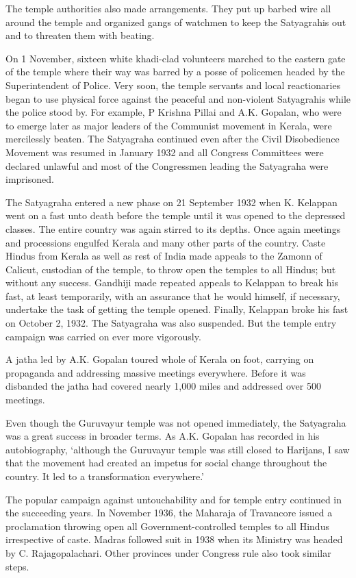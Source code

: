 The temple authorities also made arrangements. They put up barbed wire all around the temple and organized gangs of watchmen to keep the Satyagrahis out and to threaten them with beating.

On 1 November, sixteen white khadi-clad volunteers marched to the eastern gate of the temple where their way was barred by a posse of policemen headed by the Superintendent of Police. Very soon, the temple servants and local reactionaries began to use physical force against the peaceful and non-violent Satyagrahis while the police stood by. For example, P Krishna Pillai and A.K. Gopalan, who were to emerge later as major leaders of the Communist movement in Kerala, were mercilessly beaten. The Satyagraha continued even after the Civil Disobedience Movement was resumed in January 1932 and all Congress Committees were declared unlawful and most of the Congressmen leading the Satyagraha were imprisoned.

The Satyagraha entered a new phase on 21 September 1932 when K. Kelappan went on a fast unto death before the temple until it was opened to the depressed classes. The entire country was again stirred to its depths. Once again meetings and processions engulfed Kerala and many other parts of the country. Caste Hindus from Kerala as well as rest of India made appeals to the Zamonn of Calicut, custodian of the temple, to throw open the temples to all Hindus; but without any success. Gandhiji made repeated appeals to Kelappan to break his fast, at least temporarily, with an assurance that he would himself, if necessary, undertake the task of getting the temple opened. Finally, Kelappan broke his fast on October 2, 1932. The Satyagraha was also suspended. But the temple entry campaign was carried on ever more vigorously.

A jatha led by A.K. Gopalan toured whole of Kerala on foot, carrying on propaganda and addressing massive meetings everywhere. Before it was disbanded the jatha had covered nearly 1,000 miles and addressed over 500 meetings.

Even though the Guruvayur temple was not opened immediately, the Satyagraha was a great success in broader terms. As A.K. Gopalan has recorded in his autobiography, `although the Guruvayur temple was still closed to Harijans, I saw that the movement had created an impetus for social change throughout the country. It led to a transformation everywhere.'

The popular campaign against untouchability and for temple entry continued in the succeeding years. In November 1936, the Maharaja of Travancore issued a proclamation throwing open all Government-controlled temples to all Hindus irrespective of caste. Madras followed suit in 1938 when its Ministry was headed by C. Rajagopalachari. Other provinces under Congress rule also took similar steps.

